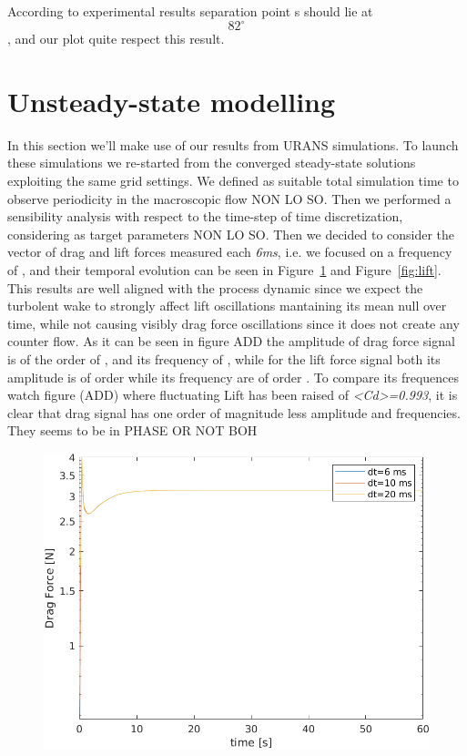 \documentclass[12pt]{article}
\begin{document}
According to experimental results separation point s should lie at $$ 82 ^\circ $$, and our plot quite respect this result.

\section{Unsteady-state modelling} \label{sec:URAN}
In this section we'll make use of our results from URANS simulations. To launch these simulations we re-started from the converged steady-state solutions exploiting the same grid settings.
We defined as suitable total simulation time to observe periodicity in the macroscopic flow NON LO SO.
Then we performed a sensibility analysis with respect to the time-step of time discretization, considering as target parameters NON LO SO.
Then we decided to consider the vector of drag and lift forces measured each \textit{6ms}, i.e. we focused on a frequency of , and their temporal evolution can be seen in Figure~\ref{fig:drag} and Figure~\ref{fig:lift}. This results are well aligned with the process dynamic since we expect the turbolent wake to strongly affect lift oscillations mantaining its mean null over time, while not causing visibly drag force oscillations since it does not create any counter flow.
As it can be seen in figure ADD the amplitude of drag force signal is of the order of , and its frequency of , while for the lift force signal both its amplitude is of order  while its frequency are of order . 
To compare its frequences watch figure (ADD) where fluctuating Lift has been raised of \textit{<Cd>=0.993}, it is clear that drag signal has one order of magnitude less amplitude and frequencies. They seems to be in PHASE OR NOT BOH

        \begin{figure}[!ht]
                \includegraphics[width=\textwidth]{DragForce.png}
                \centering
                \caption{}
                \label{fig:drag}
        \end{figure}
\end{document}
